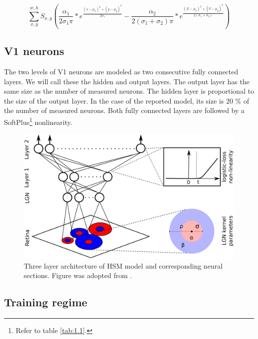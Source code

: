 \begin{equation}\label{eq:2.1}
    \sum_{x,y}^{w,h} S_{x,y}
(
{\frac{\alpha_1}{ 2 \sigma_1 \pi}} * e^{\frac{(x - \mu_x)^2 + (y - \mu_y)^2}{2\sigma_1}} -
{\frac{\alpha_2}{2 (\sigma_1+\sigma_2) \pi}} * e^{\frac{(X - \mu_x)^2 + (Y - \mu_y)^2}{ 2(\sigma_1+\sigma_2) }}
)
\end{equation}

\subsection{V1 neurons}
The two levels of V1 neurons are modeled as two consecutive fully connected layers. We will call these the hidden and output layers. The output layer has the same size as the number of measured neurons. The hidden layer is proportional to the size of the output layer. In the case of the reported model, its size is 20 \% of the number of measured neurons. Both fully connected layers are followed by a SoftPlus\footnote{Refer to table \ref{tab:1.1}.} nonlinearity.

\begin{figure}[h]
    \centering
    \includegraphics[width=1\textwidth]{../figures/02_HSM}
    \caption[HSM model architecture]{Three layer architecture of HSM model and corresponding neural sections. Figure was adopted from \cite{antolik}.}
    \label{fig:2.1}
\end{figure}

\subsection{Training regime}\label{ch:2.1.3}

